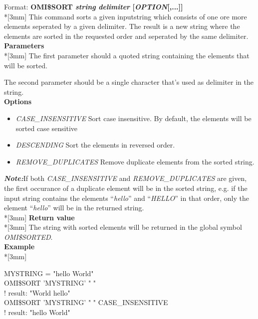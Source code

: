 \documentclass[a4paper]{book}
\renewcommand{\indent}{\hspace*{5mm}}
\begin{document}
\indent Format: \textbf{OMI{\$}SORT \textit{string} \textit{delimiter} [\textit{OPTION}[,...]]}\\*[3mm]
This command sorts a given inputstring which consists of one ore more elements seperated by a given delimiter.
The result is a new string where the elements are sorted in the requested order and seperated by the same delimiter.\\[3mm]
\textbf{Parameters}\\*[3mm]
The first parameter should a quoted string containing the elements that will be sorted.

The second parameter should be a single character that's used as delimiter in the string.\\[3mm]
\textbf{Options}\\
\begin{itemize}
\item \textsl{CASE{\_}INSENSITIVE} Sort case insensitive. By default, the elements will be sorted case sensitive

\item \textsl{DESCENDING} Sort the elements in reversed order.

\item \textsl{REMOVE{\_}DUPLICATES} Remove duplicate elements from the sorted string.
\end{itemize}
\textbf{\textit{Note:}}If both \textsl{CASE{\_}INSENSITIVE} and \textsl{REMOVE{\_}DUPLICATES} are given, the first occurance of a duplicate element will
be in the sorted string, e.g. if the input string contains the elements ``\textsl{hello}'' and ``\textsl{HELLO}'' in that order, only the element
``\textsl{hello}'' will be in the returned string.\\*[3mm]
\textbf{Return value}\\*[3mm]
The string with sorted elements will be returned in the global symbol 
\textsl{OMI{\$}SORTED}.\\[3mm]
\textbf{Example}\\*[3mm]
\begin{small}
\begin{texttt}
\indent{\$} MYSTRING = "hello World" \\
\indent{\$} OMI{\$}SORT 'MYSTRING' " " \\
\indent{\$}!\hspace{3cm} result: "World hello"  \\
\indent{\$} OMI{\$}SORT 'MYSTRING' " " CASE{\_}INSENSITIVE\\
\indent{\$}!\hspace{3cm} result: "hello World"  \\
\end{texttt}
\end{small}
\end{document}
